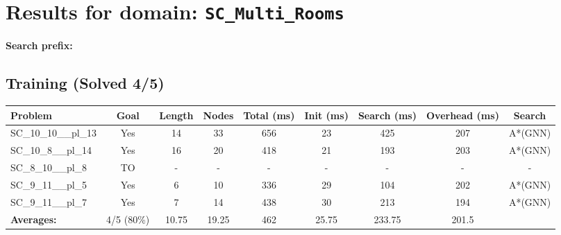 \documentclass{article}
\begin{document}
\section*{Results for domain: \texttt{SC\_Multi\_Rooms}}
\textbf{Search prefix:} 
\\[0.5cm]
\subsection*{Training (Solved 4/5)}
\begin{tabular}{lcccccccc}
\toprule
Problem & Goal & Length & Nodes & Total (ms) & Init (ms) & Search (ms) & Overhead (ms) & Search \\
\midrule
SC\_10\_10\_\_pl\_13 & Yes & 14 & 33 & 656 & 23 & 425 & 207 & A*(GNN) \\
SC\_10\_8\_\_pl\_14 & Yes & 16 & 20 & 418 & 21 & 193 & 203 & A*(GNN) \\
SC\_8\_10\_\_pl\_8 & TO & - & - & - & - & - & - & - \\
SC\_9\_11\_\_pl\_5 & Yes & 6 & 10 & 336 & 29 & 104 & 202 & A*(GNN) \\
SC\_9\_11\_\_pl\_7 & Yes & 7 & 14 & 438 & 30 & 213 & 194 & A*(GNN) \\
\textbf{Averages:} & 4/5 (80\%) & 10.75 & 19.25 & 462 & 25.75 & 233.75 & 201.5 & \\
\bottomrule
\end{tabular}
\\[0.7cm]
\end{document}
